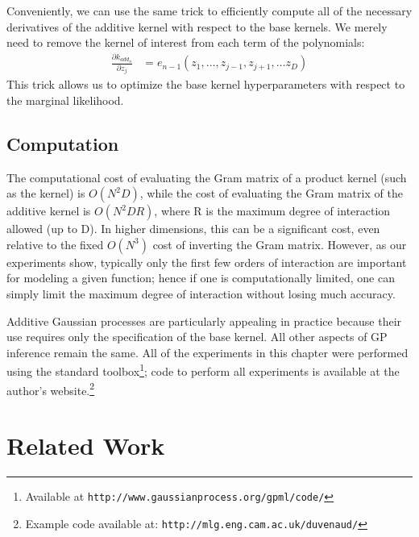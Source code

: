 Conveniently, we can use the same trick to efficiently compute all of the necessary derivatives of the additive kernel with respect to the base kernels.
We merely need to remove the kernel of interest from each term of the polynomials:
%
\begin{align}
\frac{\partial k_{add_n}}{\partial z_j} & = e_{n-1}(z_1,\dots,z_{j-1},z_{j+1}, \dots z_D)
\end{align}
%
This trick allows us to optimize the base kernel hyperparameters with respect to the marginal likelihood.



\subsection{Computation}
The computational cost of evaluating the Gram matrix of a product kernel (such as the \kSE{} kernel) is $O(N^2D)$, while the cost of evaluating the Gram matrix of the additive kernel is $O(N^2DR)$, where R is the maximum degree of interaction allowed (up to D).
In higher dimensions, this can be a significant cost, even relative to the fixed $O(N^3)$ cost of inverting the Gram matrix.
%
However, as our experiments show, typically only the first few orders of interaction are important for modeling a given function; hence if one is computationally limited, one can simply limit the maximum degree of interaction without losing much accuracy.

Additive Gaussian processes are particularly appealing in practice because their use requires only the specification of the base kernel.  All other aspects of GP inference remain the same.  All of the experiments in this chapter were performed using the standard \GPML{} toolbox\footnote{Available at \texttt{http://www.gaussianprocess.org/gpml/code/}};
code to perform all experiments is available at the author's website.\footnote{Example code available at: \texttt{http://mlg.eng.cam.ac.uk/duvenaud/}}


\section{Related Work}

